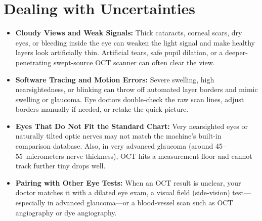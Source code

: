 \section{Dealing with Uncertainties}
\begin{itemize}
\item \textbf{Cloudy Views and Weak Signals:} Thick cataracts, corneal scars, dry eyes, or bleeding inside the eye can weaken the light signal and make healthy layers look artificially thin. Artificial tears, safe pupil dilation, or a deeper-penetrating swept-source OCT scanner can often clear the view.
\item \textbf{Software Tracing and Motion Errors:} Severe swelling, high nearsightedness, or blinking can throw off automated layer borders and mimic swelling or glaucoma. Eye doctors double-check the raw scan lines, adjust borders manually if needed, or retake the quick picture.
\item \textbf{Eyes That Do Not Fit the Standard Chart:} Very nearsighted eyes or naturally tilted optic nerves may not match the machine's built-in comparison database. Also, in very advanced glaucoma (around 45--55~micrometers nerve thickness), OCT hits a measurement floor and cannot track further tiny drops well.
\item \textbf{Pairing with Other Eye Tests:} When an OCT result is unclear, your doctor matches it with a dilated eye exam, a visual field (side-vision) test---especially in advanced glaucoma---or a blood-vessel scan such as OCT angiography or dye angiography.
\end{itemize}

